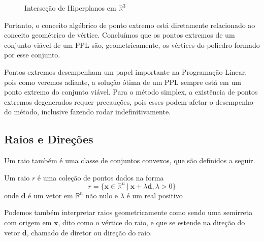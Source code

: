 \begin{itemize}
\begin{figure}[H]
	\caption{Interseção de Hiperplanos em $\mathbb{R}^3$}
	\end{figure}
\end{itemize}

Portanto, o conceito algébrico de ponto extremo está diretamente relacionado ao conceito geométrico de vértice. Concluímos que os pontos extremos de um conjunto viável de um PPL são, geometricamente, os vértices do poliedro formado por esse conjunto.
     

Pontos extremos desempenham um papel importante na Programação Linear, pois como veremos adiante, a solução ótima de um PPL sempre está em um ponto extremo do conjunto viável. Para o método simplex, a existência de pontos extremos degenerados requer precauções, pois esses podem afetar o desempenho do método, inclusive fazendo rodar indefinitivamente.   

\subsection{Raios e Direções}

Um raio também é uma classe de conjuntos convexos, que são definidos a seguir.

\begin{def:raio}
	Um raio $r$ é uma coleção de pontos dados na forma
	\begin{equation*}
		r = \{\mathbf{x} \in \mathbb{R}^n \ |\  \mathbf{x} + \lambda \mathbf{d}, \lambda > 0\}
	\end{equation*}
	onde $\mathbf{d}$ é um vetor em $\mathbb{R}^n$ não nulo e $\lambda$ é um real positivo
\end{def:raio}

Podemos também interpretar raios geometricamente como sendo uma semirreta com origem em $\mathbf{x}$, dito como o vértice do raio, e que se estende na direção do vetor $\mathbf{d}$, chamado de diretor ou direção do raio.

